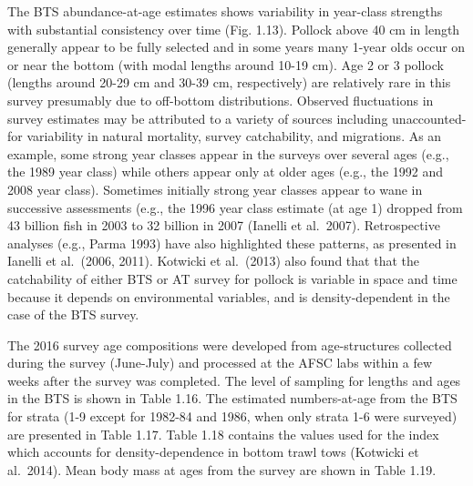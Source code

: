 The BTS abundance-at-age estimates shows variability in year-class
strengths with substantial consistency over time (Fig. 1.13). Pollock
above 40 cm in length generally appear to be fully selected and in some
years many 1-year olds occur on or near the bottom (with modal lengths
around 10-19 cm). Age 2 or 3 pollock (lengths around 20-29 cm and 30-39
cm, respectively) are relatively rare in this survey presumably due to
off-bottom distributions. Observed fluctuations in survey estimates may
be attributed to a variety of sources including unaccounted-for
variability in natural mortality, survey catchability, and migrations.
As an example, some strong year classes appear in the surveys over
several ages (e.g., the 1989 year class) while others appear only at
older ages (e.g., the 1992 and 2008 year class). Sometimes initially
strong year classes appear to wane in successive assessments (e.g., the
1996 year class estimate (at age 1) dropped from 43 billion fish in 2003
to 32 billion in 2007 (Ianelli et al.~2007). Retrospective analyses
(e.g., Parma 1993) have also highlighted these patterns, as presented in
Ianelli et al.~(2006, 2011). Kotwicki et al.~(2013) also found that that
the catchability of either BTS or AT survey for pollock is variable in
space and time because it depends on environmental variables, and is
density-dependent in the case of the BTS survey.

The 2016 survey age compositions were developed from age-structures
collected during the survey (June-July) and processed at the AFSC labs
within a few weeks after the survey was completed. The level of sampling
for lengths and ages in the BTS is shown in Table 1.16. The estimated
numbers-at-age from the BTS for strata (1-9 except for 1982-84 and 1986,
when only strata 1-6 were surveyed) are presented in Table 1.17. Table
1.18 contains the values used for the index which accounts for
density-dependence in bottom trawl tows (Kotwicki et al.~2014). Mean
body mass at ages from the survey are shown in Table 1.19.

